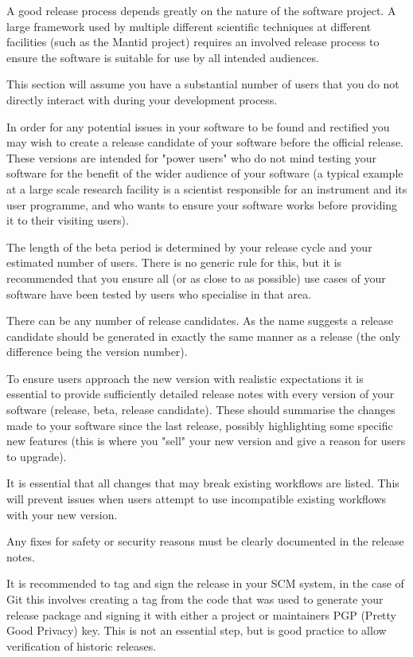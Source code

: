 \documentclass[jnr]{iosart2x}
\begin{document}
A good release process depends greatly on the nature of the software project.
A large framework used by multiple different scientific techniques at different facilities (such as the Mantid project) requires an involved release process to ensure the software is suitable for use by all intended audiences.

This section will assume you have a substantial number of users that you do not directly interact with during your development process.

In order for any potential issues in your software to be found and rectified you may wish to create a release candidate of your software before the official release.
These versions are intended for "power users" who do not mind testing your software for the benefit of the wider audience of your software (a typical example at a large scale research facility is a scientist responsible for an instrument and its user programme, and who wants to ensure your software works before providing it to their visiting users).

The length of the beta period is determined by your release cycle and your estimated number of users.
There is no generic rule for this, but it is recommended that you ensure all (or as close to as possible) use cases of your software have been tested by users who specialise in that area.

There can be any number of release candidates.
As the name suggests a release candidate should be generated in exactly the same manner as a release (the only difference being the version number).

To ensure users approach the new version with realistic expectations it is essential to provide sufficiently detailed release notes with every version of your software (release, beta, release candidate).
These should summarise the changes made to your software since the last release, possibly highlighting some specific new features (this is where you "sell" your new version and give a reason for users to upgrade).

It is essential that all changes that may break existing workflows are listed.
This will prevent issues when users attempt to use incompatible existing workflows with your new version.

Any fixes for safety or security reasons must be clearly documented in the release notes.

It is recommended to tag and sign the release in your SCM system, in the case of Git this involves creating a tag from the code that was used to generate your release package and signing it with either a project or maintainers PGP (Pretty Good Privacy) key.
This is not an essential step, but is good practice to allow verification of historic releases.
\end{document}
